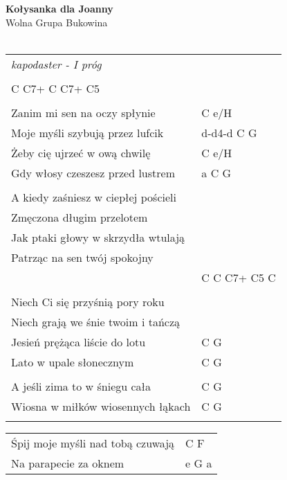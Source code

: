 \documentclass[a5paper]{article}
\begin{document}


\noindent
\fontsize{12pt}{15pt}\selectfont
\textbf{Kołysanka dla Joanny} \\
\fontsize{8pt}{10pt}\selectfont
Wolna Grupa Bukowina \\ \\
\fontsize{10pt}{12pt}\selectfont
{}
\begin{tabular}{@{}p{8.00cm}p{3cm}@{}}
\noindent
\emph{kapodaster - I próg} \\ \\

C C7+ C C7+ C5 \\ \\

Zanim mi sen na oczy spłynie & C e/H \\
Moje myśli szybują przez lufcik & d-d4-d C G \\
Żeby cię ujrzeć w ową chwilę & C e/H \\
Gdy włosy czeszesz przed lustrem & a C G \\ \\

A kiedy zaśniesz w ciepłej pościeli \\
Zmęczona długim przelotem \\
Jak ptaki głowy w skrzydła wtulają \\
Patrząc na sen twój spokojny \\
& C C C7+ C5 C \\ \\

Niech Ci się przyśnią pory roku \\
Niech grają we śnie twoim i tańczą \\
Jesień prężąca liście do lotu & C G \\
Lato w upale słonecznym & C G \\ \\

A jeśli zima to w śniegu cała & C G \\
Wiosna w miłków wiosennych łąkach & C G \\ \\
\end{tabular}

\noindent
\begin{tabular}{@{}p{7.00cm}p{3cm}@{}}
Śpij moje myśli nad tobą czuwają & C F \\
Na parapecie za oknem & e G a
\end{tabular}
\end{document}
